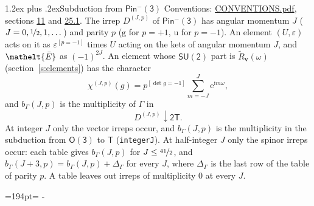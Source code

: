 \documentclass[10pt,a4paper]{article}
\makeatletter
\renewcommand\section{\@startsection{section}{1}{\z@}{-3ex plus -1ex minus -.2ex}%
  {1.2ex plus .2ex}{\normalfont\large\sffamily\bfseries\color{parttitle}}}
\newcommand{\needspace}[1]{\par\penalty-100\begingroup\dimen0=#1\relax\dimen2=\pagegoal
  \advance\dimen2-\pagetotal\ifdim\dimen0>\dimen2\relax\ifdim\dimen2>0pt\vfil\break\fi\fi
  \endgroup}
\numberwithin{equation}{section}
\newcommand{\eltfont}[1]{{\let\sigma\eltsigma\mathelt{#1}}}
\newcommand{\grp}[1]{\mathsf{#1}}
\newcommand{\elt}[1]{\eltfont{#1}}
\newcommand{\ptag}[1]{\mathrm{#1}}
\newcommand{\iverson}[1]{[#1]}
\newcommand{\restr}[2]{#1\!\downarrow#2}
\newcommand{\vv}{\mathbf{v}}
\newcommand{\iunit}{\mathrm{i}}
\newcommand{\expe}{\mathrm{e}}
\newcommand{\irrJp}[2]{D^{(#1,#2)}}
\newcommand{\barred}[1]{\bar{#1}}
\newcommand{\lift}[1]{\tilde{#1}}
\makeatother
\begin{document}
\section{Subduction from \texorpdfstring{$\grp{Pin^{-}(3)}$}{Pin(3)}}\label{s:subduction_parent}
Conventions: \href{../../CONVENTIONS.pdf}{CONVENTIONS.pdf}, sections \href{../../../rotation/CONVENTIONS.pdf\#conv.11}{11} and \href{../../CONVENTIONS.pdf\#conv.25.1}{25.1}.
\leavevmode\label{n:index.J}\label{n:index.parity}\label{n:irrep.o3}The irrep $\irrJp{J}{p}$ of \href{Pinminus3.pdf}{$\grp{Pin^{-}(3)}$} has angular momentum $J$ ($J = 0, \nicefrac{1}{2}, 1, \dots$) and parity $p$ ($\ptag{g}$ for $p = +1$, $\ptag{u}$ for $p = -1$). An element $(U, \varepsilon)$ acts on it as $\varepsilon^{[p = -1]}$ times $U$ acting on the kets of angular momentum $J$, and $\elt{\barred{E}}$ as $(-1)^{2J}$. \label{n:function.character.parent}\label{n:function.multiplicity}An element whose $\grp{SU(2)}$ part is $\lift{R}_{\vv}(\omega)$ (section~\ref{s:elements}) has the character
\begin{equation}\label{e:chi}\chi^{(J,p)}(g) = p^{\iverson{\det g = -1}}\sum_{m=-J}^{J} \expe^{\iunit m\omega},\end{equation}
and $b_\Gamma(J, p)$ is the multiplicity of $\Gamma$ in
\begin{equation}\label{e:parent}\restr{\irrJp{J}{p}}{\grp{2T}}.\end{equation}
At integer $J$ only the vector irreps occur, and $b_\Gamma(J, p)$ is the multiplicity in the subduction from $\grp{O(3)}$ to \href{../../../rotation/data/pdf/T.pdf}{$\grp{T}$} (\texttt{integerJ}). \label{n:index.increment}At half-integer $J$ only the spinor irreps occur: each table gives $b_\Gamma(J, p)$ for $J \le \nicefrac{41}{2}$, and $b_\Gamma(J + 3, p) = b_\Gamma(J, p) + \Delta_\Gamma$ for every $J$, where $\Delta_\Gamma$ is the last row of the table of parity $p$. A table leaves out irreps of multiplicity 0 at every $J$.
\needspace{194pt}
\end{document}
